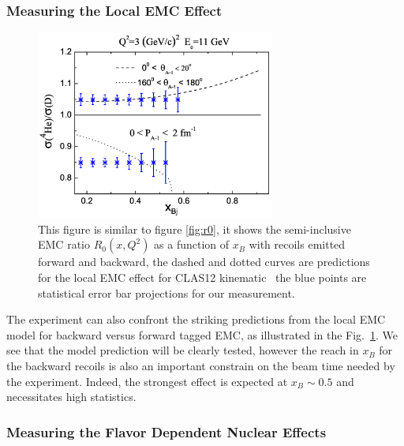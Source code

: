 \subsubsection{Measuring the Local EMC Effect}

\begin{figure}
  \begin{center}
    \includegraphics[angle=0, width=0.7\textwidth]{./fig-chap3/Fig10_new}
    \caption{This figure is similar to figure \ref{fig:r0}, it shows the semi-inclusive EMC ratio $R_0(x,Q^2)$ as a function of $x_B$ with recoils emitted forward and backward, the dashed and dotted curves are predictions for the local EMC effect for CLAS12 kinematic~\cite{CiofidegliAtti1999,CiofidegliAtti2012} the blue points are statistical error bar projections for our measurement.}
    \label{fig:fig:r0_proj}
  \end{center}
\end{figure}

The experiment can also confront the striking predictions from the local EMC model for backward versus forward tagged EMC, as illustrated in the Fig.~\ref{fig:fig:r0_proj}. We see that the model prediction will be clearly tested, however the reach in $x_B$ for the backward recoils is also an important constrain on the beam time needed by the experiment. Indeed, the strongest effect is expected at $x_B \sim 0.5$ and necessitates high statistics. 

\subsubsection{Measuring the Flavor Dependent Nuclear Effects}

